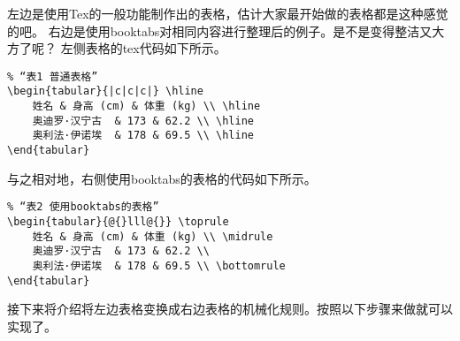 \documentclass{article}
\begin{document}
左边是使用Tex的一般功能制作出的表格，估计大家最开始做的表格都是这种感觉的吧。
右边是使用booktabs对相同内容进行整理后的例子。是不是变得整洁又大方了呢？
左侧表格的tex代码如下所示。
\begin{verbatim}
% “表1 普通表格”
\begin{tabular}{|c|c|c|} \hline
    姓名 & 身高 (cm) & 体重 (kg) \\ \hline
    奥迪罗·汉宁古  & 173 & 62.2 \\ \hline 
    奥利法·伊诺埃  & 178 & 69.5 \\ \hline  
\end{tabular}
\end{verbatim}
与之相对地，右侧使用booktabs的表格的代码如下所示。
\begin{verbatim}
% “表2 使用booktabs的表格”
\begin{tabular}{@{}lll@{}} \toprule
    姓名 & 身高 (cm) & 体重 (kg) \\ \midrule
    奥迪罗·汉宁古  & 173 & 62.2 \\ 
    奥利法·伊诺埃  & 178 & 69.5 \\ \bottomrule  
\end{tabular}
\end{verbatim}
接下来将介绍将左边表格变换成右边表格的机械化规则。按照以下步骤来做就可以实现了。
\end{document}

